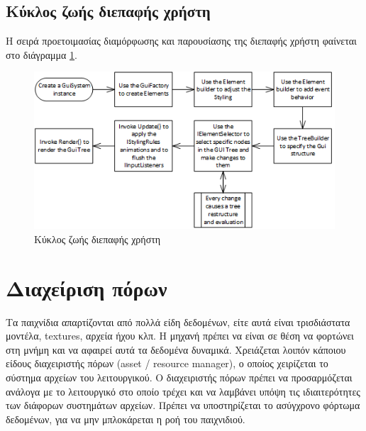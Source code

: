 \newpage
\subsection{Κύκλος ζωής διεπαφής χρήστη}
Η σειρά προετοιμασίας διαμόρφωσης και παρουσίασης της διεπαφής χρήστη φαίνεται στο διάγραμμα \ref{fig:ui_usage}.

\begin{figure}[h!]
	\centering
	\includegraphics[width=130mm]{Images/gui_usage}
	\caption{Κύκλος ζωής διεπαφής χρήστη}
	\label{fig:ui_usage}
\end{figure}
\newpage

\section{Διαχείριση πόρων}
Τα παιχνίδια απαρτίζονται από πολλά είδη δεδομένων, είτε αυτά είναι τρισδιάστατα μοντέλα, textures, αρχεία ήχου κλπ. Η μηχανή πρέπει να είναι σε θέση να φορτώνει στη μνήμη και να αφαιρεί αυτά τα δεδομένα δυναμικά. Χρειάζεται λοιπόν κάποιου είδους διαχειριστής πόρων (asset / resource manager), ο οποίος χειρίζεται το σύστημα αρχείων του λειτουργικού. Ο διαχειριστής πόρων πρέπει να προσαρμόζεται ανάλογα με το λειτουργικό στο οποίο τρέχει και να λαμβάνει υπόψη τις ιδιαιτερότητες των διάφορων συστημάτων αρχείων. Πρέπει να υποστηρίζεται το ασύγχρονο φόρτωμα δεδομένων, για να μην μπλοκάρεται η ροή του παιχνιδιού.


